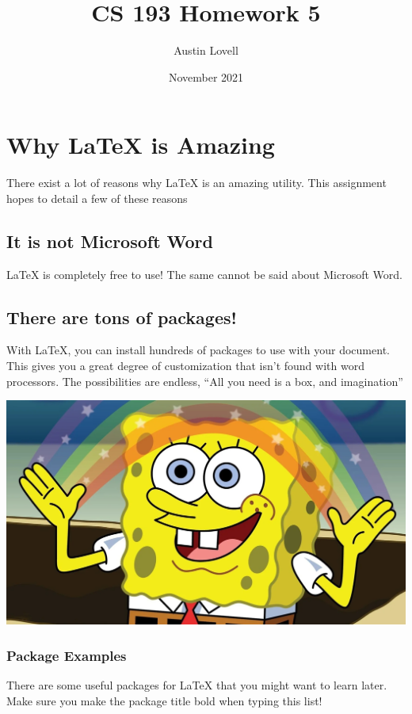 \documentclass{article}
\title{CS 193 Homework 5}
\author{Austin Lovell}
\date{November 2021}
\begin{document}
\maketitle

\section{Why LaTeX is Amazing}
{There exist a lot of reasons why LaTeX is an amazing utility. This assignment hopes to detail a few of these reasons}
\subsection{It is not Microsoft Word}
{LaTeX is completely free to use! The same cannot be said about Microsoft Word.}
\subsection{There are tons of packages!}
{With LaTeX, you can install hundreds of packages to use with your document. This gives you a great degree of customization that isn't found with word processors. The possibilities are endless, ``All you need is a box, and imagination''}
\begin{center}
    \includegraphics[scale=0.17]{imagination.png}
\end{center}
\subsubsection{Package Examples}
{There are some useful packages for LaTeX that you might want to learn later. Make sure you make the package title bold when typing this list!}



\end{document}
